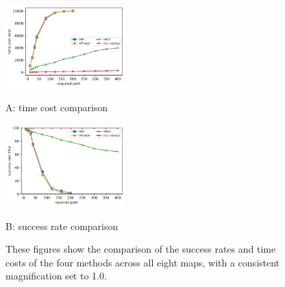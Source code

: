 \documentclass[letterpaper, 10 pt, journal, twoside]{IEEEtran}
\begin{document}
\begin{figure}[t] \scriptsize
\begin{minipage}{.48\linewidth}
  \centerline{\includegraphics[width=4.6cm]{comparison_time_and_count.png}}
  \centerline{A: time cost comparison}
\end{minipage}
\hfill
\begin{minipage}{.48\linewidth}
  \centerline{\includegraphics[width=4.6cm]{comparison_succ_and_count.png}}
  \centerline{B: success rate comparison}
\end{minipage}
\vfill

\caption{These figures show the comparison of the success rates and time costs of the four methods across all eight maps, with a consistent magnification set to 1.0.}
\label{compariosn_between_methods}
\end{figure}



\end{document}
